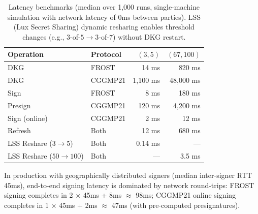 \begin{table}[H]
\centering
\small
\begin{tabular}{@{}llrr@{}}
\toprule
\textbf{Operation} & \textbf{Protocol} & \textbf{$(3,5)$} & \textbf{$(67,100)$} \\
\midrule
DKG & FROST & 14 ms & 820 ms \\
DKG & CGGMP21 & 1,100 ms & 48,000 ms \\
Sign & FROST & 8 ms & 180 ms \\
Presign & CGGMP21 & 120 ms & 4,200 ms \\
Sign (online) & CGGMP21 & 2 ms & 12 ms \\
Refresh & Both & 12 ms & 680 ms \\
LSS Reshare ($3 \to 5$) & Both & 0.14 ms & --- \\
LSS Reshare ($50 \to 100$) & Both & --- & 3.5 ms \\
\bottomrule
\end{tabular}
\caption{Latency benchmarks (median over 1,000 runs, single-machine simulation with
network latency of 0ms between parties). LSS (Lux Secret Sharing) dynamic resharing
enables threshold changes (e.g., $3$-of-$5 \to 3$-of-$7$) without DKG restart.}
\label{tab:perf}
\end{table}

In production with geographically distributed signers (median inter-signer RTT 45ms),
end-to-end signing latency is dominated by network round-trips: FROST signing
completes in 2 $\times$ 45ms + 8ms $\approx$ 98ms; CGGMP21 online signing completes
in 1 $\times$ 45ms + 2ms $\approx$ 47ms (with pre-computed presignatures).


